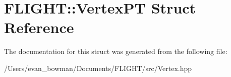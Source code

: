 \hypertarget{struct_f_l_i_g_h_t_1_1_vertex_p_t}{}\section{F\+L\+I\+G\+HT\+:\+:Vertex\+PT Struct Reference}
\label{struct_f_l_i_g_h_t_1_1_vertex_p_t}


The documentation for this struct was generated from the following file\+:\begin{DoxyCompactItemize}
\item 
/\+Users/evan\+\_\+bowman/\+Documents/\+F\+L\+I\+G\+H\+T/src/Vertex.\+hpp\end{DoxyCompactItemize}
